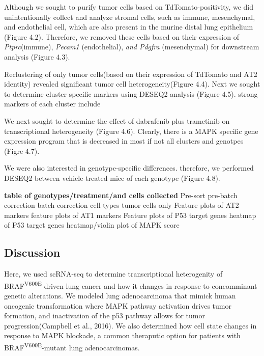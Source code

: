 Although we sought to purify tumor cells based on TdTomato-positivity, we did unintentionally collect and analyze stromal cells, such as immune, mesenchymal, and endothelial cell, which are also present in the murine distal lung epithelium (Figure 4.2). Therefore, we removed these cells based on their expression of \emph{Ptprc}(immune), \emph{Pecam1} (endothelial), \emph{and Pdgfra} (mesenchymal) for downstream analysis (Figure 4.3).

Reclustering of only tumor cells(based on their expression of TdTomato and AT2 identity) revealed significant tumor cell heterogeneity(Figure 4.4). Next we sought to determine cluster specific markers using DESEQ2 analysis (Figure 4.5). strong markers of each cluster include

We next sought to determine the effect of dabrafenib plus trametinib on transcriptional heterogeneity (Figure 4.6). Clearly, there is a MAPK specific gene expression program that is decreased in most if not all clusters and genotpes (Figre 4.7).

We were also interested in genotype-specific differences. therefore, we performed DESEQ2 between vehicle-treated mice of each genotype (Figure 4.8).

\textbf{table of genotypes/treatment/and cells collected}
Pre-sort
pre-batch correction
batch correction
cell types
tumor cells only
Feature plots of AT2 markers
feature plots of AT1 markers
Feature plots of P53 target genes
heatmap of P53 target genes
heatmap/violin plot of MAPK score

\hypertarget{discussion-1}{%
\subsection{Discussion}\label{discussion-1}}

Here, we used scRNA-seq to determine transcriptional heterogenity of BRAF\textsuperscript{V600E} driven lung cancer and how it changes in response to concomminant genetic alterations. We modeled lung adenocarcinoma that mimick human oncogenic transformation where MAPK pathway activation drives tumor formation, and inactivation of the p53 pathway allows for tumor progression(Campbell et al., 2016). We also determined how cell state changes in response to MAPK blockade, a common theraputic option for patients with BRAF\textsuperscript{V600E}-mutant lung adenocarcinomas.

